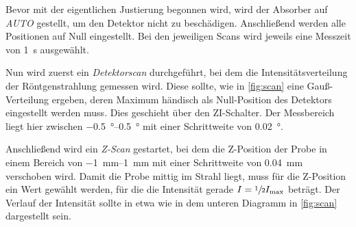 Bevor mit der eigentlichen Justierung begonnen wird,
wird der Absorber auf \emph{AUTO} gestellt,
um den Detektor nicht zu beschädigen.
Anschließend werden alle Positionen auf Null eingestellt.
Bei den jeweiligen Scans wird jeweils eine Messzeit von \SI{1}{\second} ausgewählt.

Nun wird zuerst ein \emph{Detektorscan} durchgeführt,
bei dem die Intensitätsverteilung der Röntgenstrahlung gemessen wird.
Diese sollte,
wie in \autoref{fig:scan} eine Gauß-Verteilung ergeben,
deren Maximum händisch als Null-Position des Detektors eingestellt werden muss.
Dies geschieht über den ZI-Schalter.
Der Messbereich liegt hier zwischen \SIrange{-0.5}{0.5}{\degree} mit einer Schrittweite von \SI{0.02}{\degree}.

Anschließend wird ein \emph{Z-Scan} gestartet,
bei dem die Z-Position der Probe in einem Bereich von \SIrange{-1}{1}{\milli\meter} mit einer Schrittweite von \SI{0.04}{\milli\meter} verschoben wird.
Damit die Probe mittig im Strahl liegt,
muss für die Z-Position ein Wert gewählt werden,
für die die Intensität gerade $I = \sfrac{1}{2} I_\text{max}$ beträgt.
Der Verlauf der Intensität sollte in etwa wie in dem unteren Diagramm in \autoref{fig:scan} dargestellt sein.
